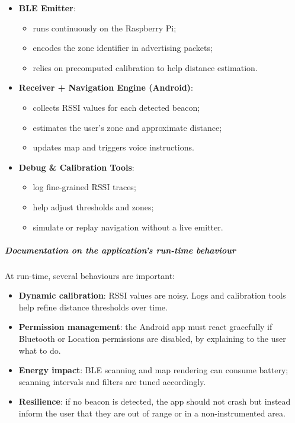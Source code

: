 \documentclass[12pt,a4paper]{article}
\begin{document}
\begin{itemize}
    \item \textbf{BLE Emitter}:
    \begin{itemize}
        \item runs continuously on the Raspberry Pi;
        \item encodes the zone identifier in advertising packets;
        \item relies on precomputed calibration to help distance estimation.
    \end{itemize}

    \item \textbf{Receiver + Navigation Engine (Android)}:
    \begin{itemize}
        \item collects RSSI values for each detected beacon;
        \item estimates the user's zone and approximate distance;
        \item updates map and triggers voice instructions.
    \end{itemize}

    \item \textbf{Debug \& Calibration Tools}:
    \begin{itemize}
        \item log fine-grained RSSI traces;
        \item help adjust thresholds and zones;
        \item simulate or replay navigation without a live emitter.
    \end{itemize}
\end{itemize}

\subparagraph{Documentation on the application's run-time behaviour}

At run-time, several behaviours are important:

\begin{itemize}
    \item \textbf{Dynamic calibration}: RSSI values are noisy. Logs and calibration tools help refine distance thresholds over time.
    \item \textbf{Permission management}: the Android app must react gracefully if Bluetooth or Location permissions are disabled, by explaining to the user what to do.
    \item \textbf{Energy impact}: BLE scanning and map rendering can consume battery; scanning intervals and filters are tuned accordingly.
    \item \textbf{Resilience}: if no beacon is detected, the app should not crash but instead inform the user that they are out of range or in a non-instrumented area.
\end{itemize}
\end{document}
